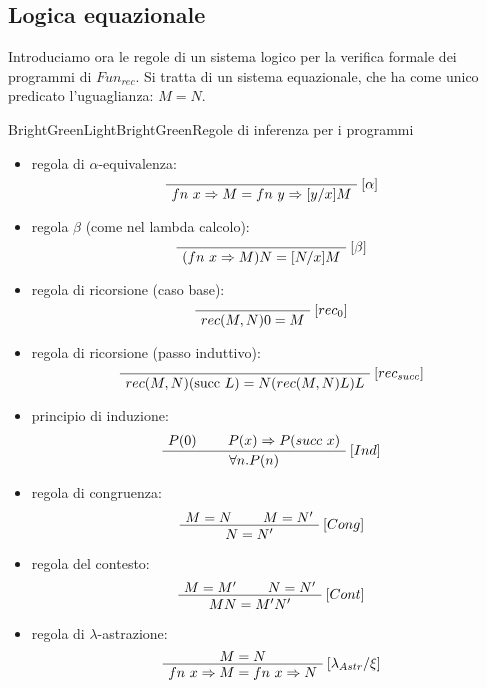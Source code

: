 \documentclass[a4paper,11pt]{report}
\begin{document}
\subsection{Logica equazionale}
Introduciamo ora le regole di un sistema logico per la verifica formale dei programmi di \( Fun_{rec} \). Si tratta di un sistema equazionale, che ha come unico predicato l'uguaglianza: \( M = N \).

\begin{cdefframe}{BrightGreenLight}{BrightGreen}{Regole di inferenza per i programmi}
\begin{itemize}
    \item regola di \( \alpha \)-equivalenza:
    \[
    \AxiomC{}
    \RightLabel{$[\alpha]$}
    \UnaryInfC{$fn \ x \Rightarrow M = fn \ y \Rightarrow [y/x]M$}
    \DisplayProof
    \]

    \item regola \( \beta \) (come nel lambda calcolo):
    \[
    \AxiomC{}
    \RightLabel{$[\beta]$}
    \UnaryInfC{$(fn \ x \Rightarrow M) N = [N/x]M$}
    \DisplayProof
    \]

    \item regola di ricorsione (caso base):
    \[
    \AxiomC{}
    \RightLabel{$[rec_0]$}
    \UnaryInfC{$rec(M, N) 0 = M$}
    \DisplayProof
    \]

    \item regola di ricorsione (passo induttivo):
    \[
    \AxiomC{}
    \RightLabel{$[rec_{succ}]$}
    \UnaryInfC{$rec(M, N) (\text{succ } L) = N(rec(M, N) L) L$}
    \DisplayProof
    \]

    \item principio di induzione:
    \[
    \AxiomC{$P(0)$}
    \AxiomC{$P(x) \Rightarrow P(succ\ x)$}
    \RightLabel{$[Ind]$}
    \BinaryInfC{$\forall n . P(n)$}
    \DisplayProof
    \]

    \item regola di congruenza:
    \[
    \AxiomC{$M = N$}
    \AxiomC{$M = N'$}
    \RightLabel{$[Cong]$}
    \BinaryInfC{$N = N'$}
    \DisplayProof
    \]

    \item regola del contesto:
    \[
    \AxiomC{$M = M'$}
    \AxiomC{$N = N'$}
    \RightLabel{$[Cont]$}
    \BinaryInfC{$M N = M' N'$}
    \DisplayProof
    \]

\item regola di $\lambda$-astrazione:
    \[
    \AxiomC{$M = N$}
    \RightLabel{$[\lambda_{Astr} / \xi]$}
    \UnaryInfC{$fn\ x \Rightarrow M = fn \ x \Rightarrow N$}
    \DisplayProof
    \]
\end{itemize}



\end{cdefframe}
\end{document}
